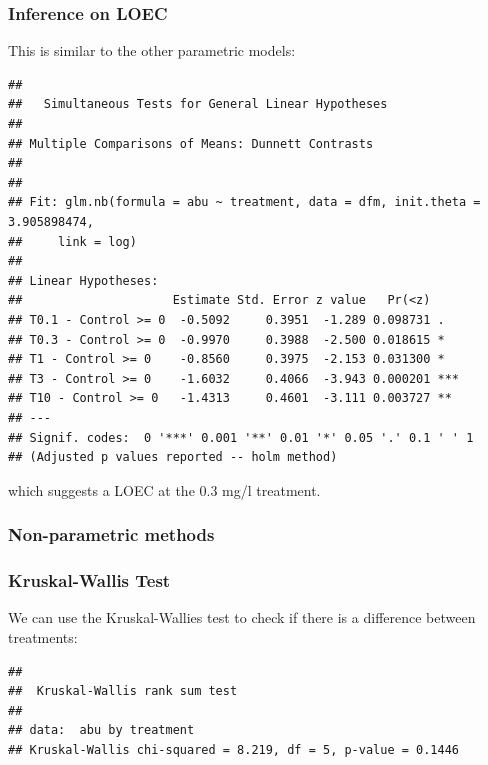 \subsubsection{Inference on LOEC}
This is similar to the other parametric models:
\begin{knitrout}
\color{fgcolor}\begin{kframe}
\begin{alltt}
\hlstd{(}  \hlstd{=} \hlstd{(} \hlstd{=} \hlstd{),}   \hlstd{=} \hlstd{),}
         \hlstd{=} \hlstd{(}\hlstd{))}
\end{alltt}
\begin{verbatim}
## 
## 	 Simultaneous Tests for General Linear Hypotheses
## 
## Multiple Comparisons of Means: Dunnett Contrasts
## 
## 
## Fit: glm.nb(formula = abu ~ treatment, data = dfm, init.theta = 3.905898474, 
##     link = log)
## 
## Linear Hypotheses:
##                     Estimate Std. Error z value   Pr(<z)    
## T0.1 - Control >= 0  -0.5092     0.3951  -1.289 0.098731 .  
## T0.3 - Control >= 0  -0.9970     0.3988  -2.500 0.018615 *  
## T1 - Control >= 0    -0.8560     0.3975  -2.153 0.031300 *  
## T3 - Control >= 0    -1.6032     0.4066  -3.943 0.000201 ***
## T10 - Control >= 0   -1.4313     0.4601  -3.111 0.003727 ** 
## ---
## Signif. codes:  0 '***' 0.001 '**' 0.01 '*' 0.05 '.' 0.1 ' ' 1
## (Adjusted p values reported -- holm method)
\end{verbatim}
\end{kframe}
\end{knitrout}
which suggests a LOEC at the 0.3 mg/l treatment.


\subsubsection{Non-parametric methods}
\subsubsection{Kruskal-Wallis Test}
We can use the Kruskal-Wallies test to check if there is a difference between treatments:

\begin{knitrout}
\color{fgcolor}\begin{kframe}
\begin{alltt}
 \hlopt{~}   
\end{alltt}
\begin{verbatim}
## 
## 	Kruskal-Wallis rank sum test
## 
## data:  abu by treatment
## Kruskal-Wallis chi-squared = 8.219, df = 5, p-value = 0.1446
\end{verbatim}
\end{kframe}
\end{knitrout}

